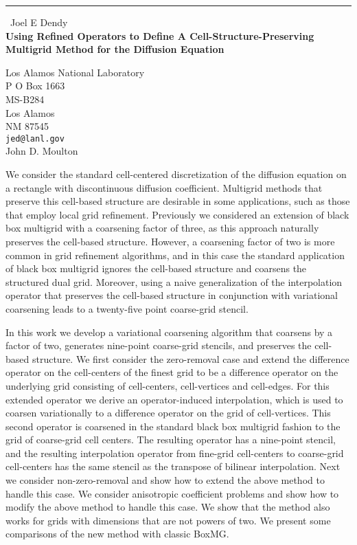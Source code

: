\documentclass{report}
\begin{document}
\begin{center}
\rule{6in}{1pt} \
{\large Joel E Dendy \\
{\bf Using Refined Operators to Define A Cell-Structure-Preserving Multigrid Method for the Diffusion Equation}}

Los Alamos National Laboratory \\ P O Box 1663 \\ MS-B284 \\ Los Alamos \\ NM 87545
\\
{\tt jed@lanl.gov}\\
John D. Moulton\end{center}

We consider the standard cell-centered discretization of the diffusion
equation on a rectangle with discontinuous diffusion coefficient.
Multigrid methods that preserve this cell-based structure are desirable
in some applications, such as those that employ local grid refinement.
Previously we considered an extension of black box multigrid with a
coarsening factor of three, as this approach naturally preserves the
cell-based structure. However, a coarsening factor of two is more common
in grid refinement algorithms, and in this case the standard application
of black box multigrid ignores the cell-based structure and coarsens the
structured dual grid. Moreover, using a naive generalization of the
interpolation operator that preserves the cell-based structure in
conjunction with variational coarsening leads to a twenty-five point
coarse-grid
stencil.

In this work we develop a variational coarsening algorithm that
coarsens by a factor of two, generates nine-point coarse-grid
stencils, and preserves the cell-based structure. We first consider the
zero-removal case and extend the difference operator on the cell-centers
of the finest grid to be a difference operator on the underlying grid
consisting of cell-centers, cell-vertices and cell-edges. For this
extended operator we derive an operator-induced interpolation, which is
used to coarsen variationally to a difference operator on the grid of
cell-vertices. This second operator is coarsened in the standard black
box multigrid fashion to the grid of coarse-grid cell centers. The
resulting operator has a nine-point stencil, and the resulting
interpolation operator from fine-grid cell-centers to coarse-grid
cell-centers has the same stencil as the transpose of bilinear
interpolation. Next we consider non-zero-removal and show how to extend
the above method to handle this case. We consider anisotropic coefficient
problems and show how to modify the above method to handle this case. We
show that the method also works for grids with dimensions that are not
powers of two. We present some comparisons of the new method with classic
BoxMG.
\end{document}
